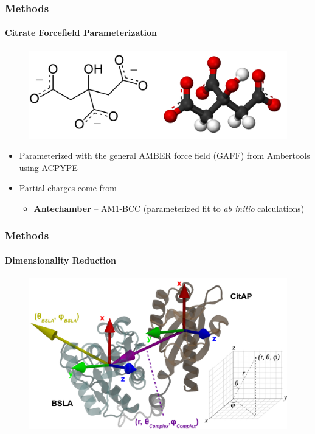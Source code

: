 \documentclass[english]{beamer}
\begin{document}

\begin{frame}
    \frametitle{Methods}
    \framesubtitle{Citrate Forcefield Parameterization}

    \begin{figure}
        \includegraphics[width=.7\linewidth]{figures/citrate.png}
    \end{figure}      

    \begin{itemize}
        \item Parameterized with the general AMBER force field (GAFF) from Ambertools using ACPYPE
        \item Partial charges come from
        \begin{itemize}
            \item \textbf{Antechamber} -- AM1-BCC (parameterized fit to \textit{ab initio} calculations)
        \end{itemize}
    \end{itemize}

    \tiny

\end{frame}   


\begin{frame}
    \frametitle{Methods}
    \framesubtitle{Dimensionality Reduction}

    \begin{figure}
        \includegraphics[width=1.0\textwidth]{figures/Collective_coords/collective_coords.pdf}
    \end{figure}        

\end{frame}     
 
\end{document}
